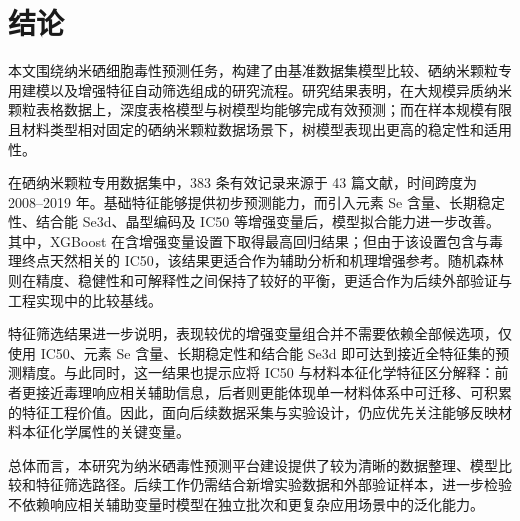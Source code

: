 \section{结论}

本文围绕纳米硒细胞毒性预测任务，构建了由基准数据集模型比较、硒纳米颗粒专用建模以及增强特征自动筛选组成的研究流程。研究结果表明，在大规模异质纳米颗粒表格数据上，深度表格模型与树模型均能够完成有效预测；而在样本规模有限且材料类型相对固定的硒纳米颗粒数据场景下，树模型表现出更高的稳定性和适用性。

在硒纳米颗粒专用数据集中，383 条有效记录来源于 43 篇文献\cite{chen_selenium_2008, li_reversal_2011, zheng_sialic_2011, liu_selenium_2012, wu_surface_2012, chen_surface_2012,
  yu_positive_2012, chen_peg-nanolized_2012, pi_pathway_2013, wu_induction_2013, feng_differential_2014,
  huang_selective_2013, li_functionalized_2013, zhang_enhancement_2013, jiang_gracilaria_2014, yu_ph-responsive_2014,
  zeng_construction_2015, liu_sequentially_2016, liu_facile_2016, yu_x-ray-responsive_2016, fu_rgd_2016,
  fang_targeting_2017, chen_efficient_2018, fang_dualtargeted_2018, huang_autophagy_2018, liu_highly_2018,
  wang_regulating_2016, hu_selenium_2019, zeng_potentiation_2019, huang_dual-targeting_2019, huang_highly_2019,
  zhang_systematic_2019, zheng_thermosensitive_2019, huang_chiralitydriven_2020,
  yang_lentinan-functionalized_2020, liu_rapid_2021, an_functionalized_2021, song_translational_2021,
  yang_atherosclerotic_2022, yang_functionalized_2021, liang_translational_2022, liu_specific_2022, du_highly_2022}，时间跨度为 2008--2019 年。基础特征能够提供初步预测能力，而引入元素 Se 含量、长期稳定性、结合能 Se3d、晶型编码及 IC50 等增强变量后，模型拟合能力进一步改善。其中，XGBoost 在含增强变量设置下取得最高回归结果；但由于该设置包含与毒理终点天然相关的 IC50，该结果更适合作为辅助分析和机理增强参考。随机森林则在精度、稳健性和可解释性之间保持了较好的平衡，更适合作为后续外部验证与工程实现中的比较基线。

特征筛选结果进一步说明，表现较优的增强变量组合并不需要依赖全部候选项，仅使用 IC50、元素 Se 含量、长期稳定性和结合能 Se3d 即可达到接近全特征集的预测精度。与此同时，这一结果也提示应将 IC50 与材料本征化学特征区分解释：前者更接近毒理响应相关辅助信息，后者则更能体现单一材料体系中可迁移、可积累的特征工程价值。因此，面向后续数据采集与实验设计，仍应优先关注能够反映材料本征化学属性的关键变量。

总体而言，本研究为纳米硒毒性预测平台建设提供了较为清晰的数据整理、模型比较和特征筛选路径。后续工作仍需结合新增实验数据和外部验证样本，进一步检验不依赖响应相关辅助变量时模型在独立批次和更复杂应用场景中的泛化能力。
